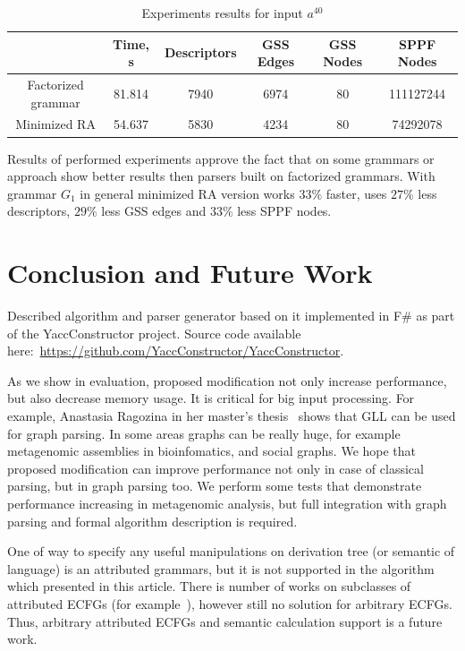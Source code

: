 \documentclass[runningheads,a4paper]{llncs}
\begin{document}
\begin{table}[ht]   
\begin{center}
    \begin{tabular}{  c | c | c | c | c | c }
        
                           & Time, s & Descriptors & GSS Edges & GSS Nodes & SPPF Nodes   \\ \hline
        Factorized grammar & 81.814  & 7940        & 6974      & 80        & 111127244  \\ \hline
        Minimized RA       & 54.637  & 5830        & 4234      & 80        & 74292078  \\ 
    \end{tabular}
\end{center}
\caption{Experiments results for input $a^{40}$}
\label{expTable}
\end{table}



Results of performed experiments approve the fact that on some grammars or approach 
show better results then parsers built on factorized grammars.
With grammar $G_1$ in general minimized RA version works $33\%$ faster, uses $27\%$ less descriptors, $29\%$ less GSS edges
and $33\%$ less SPPF nodes.

\section{Conclusion and Future Work}

Described algorithm and parser generator based on it implemented in F\# as part of the YaccConstructor project.
Source code available here:~\url{https://github.com/YaccConstructor/YaccConstructor}.


As we show in evaluation, proposed modification not only increase performance, but also decrease memory usage. 
It is critical for big input processing.
For example, Anastasia Ragozina in her master's thesis~\cite{ragozina} shows that GLL can be used for graph parsing.  
In some areas graphs can be really huge, for example metagenomic assemblies in bioinfomatics, and social graphs.
We hope that proposed modification can improve performance not only in case of classical parsing, but in graph parsing too. 
We perform some tests that demonstrate performance increasing in metagenomic analysis, but full integration with graph parsing and formal algorithm description is required.

One of way to specify any useful manipulations on derivation tree (or semantic of language) is an attributed grammars, but it is not supported in the algorithm which presented in this article.
There is number of works on subclasses of attributed ECFGs (for example~\cite{AttributedELL}), however still no solution for arbitrary ECFGs.
Thus, arbitrary attributed ECFGs and semantic calculation support is a future work.
\end{document}
